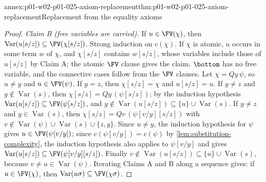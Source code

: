 \begin{annexitem}{annex:p01-w02-p01-025-axiom-replacement}{thm:p01-w02-p01-025-axiom-replacement}{Replacement from the equality axioms}
\begin{proof}
\emph{Claim B (free variables are carried).}  If \(u\in\FV(\chi)\), then
\(\operatorname{Var}(u[s/z])\subseteq\FV(\chi[s/z])\).  Strong induction on
\(c(\chi)\).  If \(\chi\) is atomic, \(u\) occurs in some term \(w\) of
\(\chi\), and \(\chi[s/z]\) contains \(w[s/z]\), whose variables include
those of \(u[s/z]\) by Claim A; the atomic \(\FV\) clause gives the claim.
\(\bottom\) has no free variable, and the connective cases follow from the
\(\FV\) clauses.  Let \(\chi=Qy\,\psi\), so \(u\ne y\) and \(u\in\FV(\psi)\).
If \(y=z\), then \(\chi[s/z]=\chi\) and \(u[s/z]=u\).  If \(y\ne z\) and
\(y\notin\operatorname{Var}(s)\), then \(\chi[s/z]=Qy\,(\psi[s/z])\); by the
induction hypothesis \(\operatorname{Var}(u[s/z])\subseteq\FV(\psi[s/z])\),
and \(y\notin\operatorname{Var}(u[s/z])\subseteq\{u\}\cup
\operatorname{Var}(s)\).  If \(y\ne z\) and \(y\in\operatorname{Var}(s)\),
then \(\chi[s/z]=Qv\,(\psi[v/y][s/z])\) with
\(v\notin\operatorname{Var}(\psi)\cup\operatorname{Var}(s)\cup\{z,y\}\).
Since \(u\ne y\), the induction hypothesis for \(\psi\) gives
\(u\in\FV(\psi[v/y])\); since \(c(\psi[v/y])=c(\psi)\) by
\cref{lem:substitution-complexity}, the induction hypothesis also applies to
\(\psi[v/y]\) and gives
\(\operatorname{Var}(u[s/z])\subseteq\FV(\psi[v/y][s/z])\).  Finally
\(v\notin\operatorname{Var}(u[s/z])\subseteq\{u\}\cup\operatorname{Var}(s)\),
because \(v\ne u\in\operatorname{Var}(\psi)\).  Iterating Claims A and B
along a sequence gives: if \(u\in\FV(\chi)\), then
\(\operatorname{Var}(u\sigma)\subseteq\FV(\chi\sigma)\).


\end{proof}
\end{annexitem}
